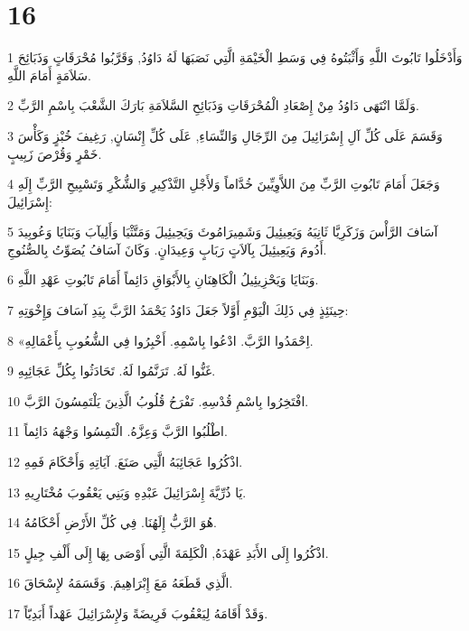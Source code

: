 \chapter{16}

\par 1 وَأَدْخَلُوا تَابُوتَ اللَّهِ وَأَثْبَتُوهُ فِي وَسَطِ الْخَيْمَةِ الَّتِي نَصَبَهَا لَهُ دَاوُدُ, وَقَرَّبُوا مُحْرَقَاتٍ وَذَبَائِحَ سَلاَمَةٍ أَمَامَ اللَّهِ.
\par 2 وَلَمَّا انْتَهَى دَاوُدُ مِنْ إِصْعَادِ الْمُحْرَقَاتِ وَذَبَائِحِ السَّلاَمَةِ بَارَكَ الشَّعْبَ بِاسْمِ الرَّبِّ.
\par 3 وَقَسَمَ عَلَى كُلِّ آلِ إِسْرَائِيلَ مِنَ الرِّجَالِ وَالنِّسَاءِ, عَلَى كُلِّ إِنْسَانٍ, رَغِيفَ خُبْزٍ وَكَأْسَ خَمْرٍ وَقُرْصَ زَبِيبٍ.
\par 4 وَجَعَلَ أَمَامَ تَابُوتِ الرَّبِّ مِنَ اللاَّوِيِّينَ خُدَّاماً وَلأَجْلِ التَّذْكِيرِ وَالشُّكْرِ وَتَسْبِيحِ الرَّبِّ إِلَهِ إِسْرَائِيلَ:
\par 5 آسَافَ الرَّأْسَ وَزَكَرِيَّا ثَانِيَهُ وَيَعِيئِيلَ وَشَمِيرَامُوثَ وَيَحِيئِيلَ وَمَتَّثْيَا وَأَلِيآبَ وَبَنَايَا وَعُوبِيدَ أَدُومَ وَيَعِيئِيلَ بِآلاَتٍ رَبَابٍ وَعِيدَانٍ. وَكَانَ آسَافُ يُصَوِّتُ بِالصُّنُوجِ.
\par 6 وَبَنَايَا وَيَحْزِيئِيلُ الْكَاهِنَانِ بِالأَبْوَاقِ دَائِماً أَمَامَ تَابُوتِ عَهْدِ اللَّهِ.
\par 7 حِينَئِذٍ فِي ذَلِكَ الْيَوْمِ أَوَّلاً جَعَلَ دَاوُدُ يَحْمَدُ الرَّبَّ بِيَدِ آسَافَ وَإِخْوَتِهِ:
\par 8 «اِحْمَدُوا الرَّبَّ. ادْعُوا بِاسْمِهِ. أَخْبِرُوا فِي الشُّعُوبِ بِأَعْمَالِهِ.
\par 9 غَنُّوا لَهُ. تَرَنَّمُوا لَهُ. تَحَادَثُوا بِكُلِّ عَجَائِبِهِ.
\par 10 افْتَخِرُوا بِاسْمِ قُدْسِهِ. تَفْرَحُ قُلُوبُ الَّذِينَ يَلْتَمِسُونَ الرَّبَّ.
\par 11 اطْلُبُوا الرَّبَّ وَعِزَّهُ. الْتَمِسُوا وَجْهَهُ دَائِماً.
\par 12 اذْكُرُوا عَجَائِبَهُ الَّتِي صَنَعَ. آيَاتِهِ وَأَحْكَامَ فَمِهِ.
\par 13 يَا ذُرِّيَّةَ إِسْرَائِيلَ عَبْدِهِ وَبَنِي يَعْقُوبَ مُخْتَارِيهِ.
\par 14 هُوَ الرَّبُّ إِلَهُنَا. فِي كُلِّ الأَرْضِ أَحْكَامُهُ.
\par 15 اذْكُرُوا إِلَى الأَبَدِ عَهْدَهُ, الْكَلِمَةَ الَّتِي أَوْصَى بِهَا إِلَى أَلْفِ جِيلٍ.
\par 16 الَّذِي قَطَعَهُ مَعَ إِبْرَاهِيمَ. وَقَسَمَهُ لإِسْحَاقَ.
\par 17 وَقَدْ أَقَامَهُ لِيَعْقُوبَ فَرِيضَةً وَلإِسْرَائِيلَ عَهْداً أَبَدِيّاً.
